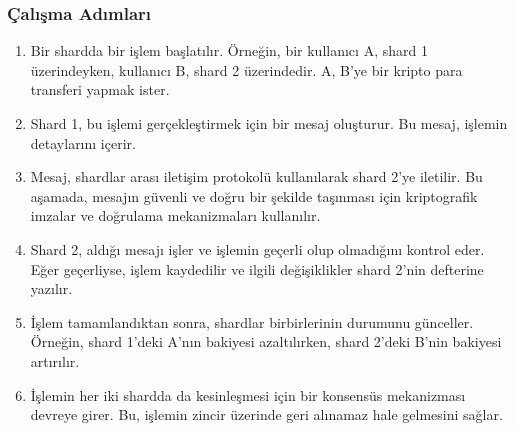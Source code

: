 \subsubsection{Çalışma Adımları}

\begin{enumerate}
    \item Bir shardda bir işlem başlatılır. Örneğin, bir kullanıcı A, shard 1 üzerindeyken, kullanıcı B, shard 2 üzerindedir. A, B'ye bir kripto para transferi yapmak ister.
    \item Shard 1, bu işlemi gerçekleştirmek için bir mesaj oluşturur. Bu mesaj, işlemin detaylarını içerir.
    \item Mesaj, shardlar arası iletişim protokolü kullanılarak shard 2’ye iletilir. Bu aşamada, mesajın güvenli ve doğru bir şekilde taşınması için kriptografik imzalar ve doğrulama mekanizmaları kullanılır.
    \item Shard 2, aldığı mesajı işler ve işlemin geçerli olup olmadığını kontrol eder. Eğer geçerliyse, işlem kaydedilir ve ilgili değişiklikler shard 2’nin defterine yazılır.
    \item İşlem tamamlandıktan sonra, shardlar birbirlerinin durumunu günceller. Örneğin, shard 1'deki A'nın bakiyesi azaltılırken, shard 2'deki B'nin bakiyesi artırılır.
    \item İşlemin her iki shardda da kesinleşmesi için bir konsensüs mekanizması devreye girer. Bu, işlemin zincir üzerinde geri alınamaz hale gelmesini sağlar.
\end{enumerate}

\newpage